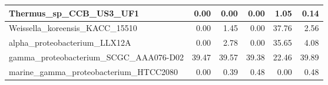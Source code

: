 \documentclass[12pt,a4paper]{article}
\begin{document}
\begin{table}[ht]
\begin{center}
\begin{tabular}{|l*{5}{|r}|}
Thermus\_sp\_CCB\_US3\_UF1 & 0.00 & 0.00 & 0.00 & 1.05 & 0.14 \\ \hline
Weissella\_koreensis\_KACC\_15510 & 0.00 & 1.45 & 0.00 & 37.76 & 2.56 \\ \hline
alpha\_proteobacterium\_LLX12A & 0.00 & 2.78 & 0.00 & 35.65 & 4.08 \\ \hline
gamma\_proteobacterium\_SCGC\_AAA076-D02 & 39.47 & 39.57 & 39.38 & 22.46 & 39.89 \\ \hline
marine\_gamma\_proteobacterium\_HTCC2080 & 0.00 & 0.39 & 0.48 & 0.00 & 0.48 \\ \hline
\end{tabular}
\end{center}
\end{table}
\end{document}
